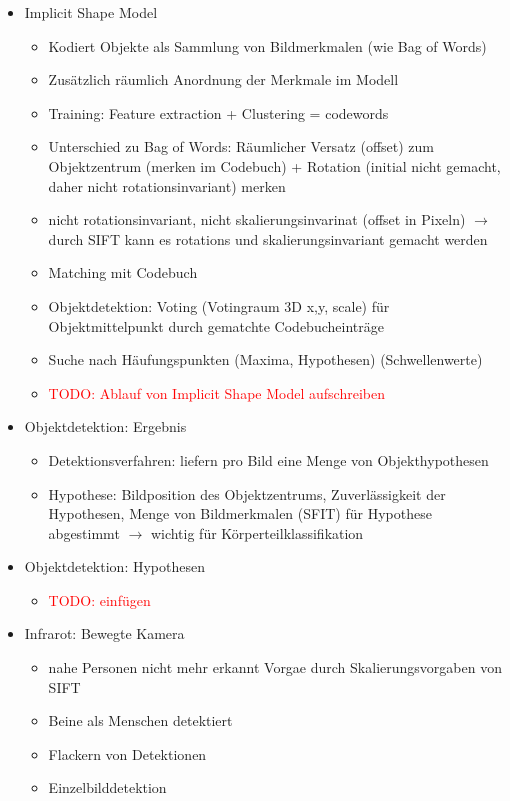 \documentclass{report}
\newcommand{\todo}[2][red]{\textcolor{#1}{TODO: #2}}
\begin{document}
\begin{itemize}
		\item Implicit Shape Model
		\begin{itemize}
			\item Kodiert Objekte als Sammlung von Bildmerkmalen (wie Bag of Words)
			\item Zusätzlich räumlich Anordnung der Merkmale im Modell
			\item Training: Feature extraction + Clustering = codewords
			\item Unterschied zu Bag of Words:
			\newline Räumlicher Versatz (offset) zum Objektzentrum (merken im Codebuch) + Rotation (initial nicht gemacht, daher nicht rotationsinvariant) merken
			\item nicht rotationsinvariant, nicht skalierungsinvarinat (offset in Pixeln)
			\newline $\rightarrow$ durch SIFT kann es rotations und skalierungsinvariant gemacht werden
			\item Matching mit Codebuch
			\item Objektdetektion: Voting (Votingraum 3D x,y, scale) für Objektmittelpunkt durch gematchte Codebucheinträge
			\item Suche nach Häufungspunkten (Maxima, Hypothesen) (Schwellenwerte)
			\item \todo{Ablauf von Implicit Shape Model aufschreiben}
		\end{itemize}
		
		\item Objektdetektion: Ergebnis
		\begin{itemize}
			\item Detektionsverfahren: liefern pro Bild eine Menge von Objekthypothesen
			\item Hypothese: Bildposition des Objektzentrums, Zuverlässigkeit der Hypothesen, Menge von Bildmerkmalen (SFIT) für Hypothese abgestimmt $\rightarrow$ wichtig für Körperteilklassifikation
		\end{itemize}
		
		\item Objektdetektion: Hypothesen
		\begin{itemize}
			\item \todo{einfügen}
		\end{itemize}
		
		\item Infrarot: Bewegte Kamera
		\begin{itemize}
			\item nahe Personen nicht mehr erkannt
			\newline Vorgae durch Skalierungsvorgaben von SIFT
			\item Beine als Menschen detektiert
			\item Flackern von Detektionen
			\item Einzelbilddetektion
		\end{itemize}
		

\end{itemize}
\end{document}
